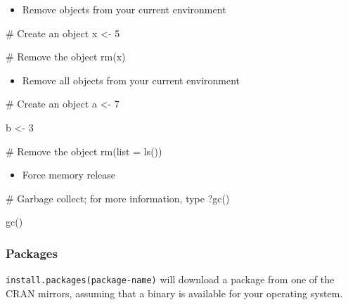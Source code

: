 \documentclass[
  letterpaper,
  DIV=11,
  numbers=noendperiod]{scrreprt}
\newenvironment{Shaded}{\begin{snugshade}}{\end{snugshade}}
\newcommand{\AttributeTok}[1]{\textcolor[rgb]{0.40,0.45,0.13}{#1}}
\newcommand{\CommentTok}[1]{\textcolor[rgb]{0.37,0.37,0.37}{#1}}
\newcommand{\DecValTok}[1]{\textcolor[rgb]{0.68,0.00,0.00}{#1}}
\newcommand{\FunctionTok}[1]{\textcolor[rgb]{0.28,0.35,0.67}{#1}}
\newcommand{\NormalTok}[1]{\textcolor[rgb]{0.00,0.23,0.31}{#1}}
\newcommand{\OtherTok}[1]{\textcolor[rgb]{0.00,0.23,0.31}{#1}}
\providecommand{\tightlist}{%
  \setlength{\itemsep}{0pt}\setlength{\parskip}{0pt}}\usepackage{longtable,booktabs,array}
\begin{document}
\begin{itemize}
\tightlist
\item
  Remove objects from your current environment
\end{itemize}

\begin{Shaded}
\begin{Highlighting}[]
\CommentTok{\# Create an object }
\NormalTok{x }\OtherTok{\textless{}{-}} \DecValTok{5}

\CommentTok{\# Remove the object }
\FunctionTok{rm}\NormalTok{(x)}
\end{Highlighting}
\end{Shaded}

\begin{itemize}
\tightlist
\item
  Remove all objects from your current environment
\end{itemize}

\begin{Shaded}
\begin{Highlighting}[]
\CommentTok{\# Create an object }
\NormalTok{a }\OtherTok{\textless{}{-}} \DecValTok{7}

\NormalTok{b }\OtherTok{\textless{}{-}} \DecValTok{3}

\CommentTok{\# Remove the object }
\FunctionTok{rm}\NormalTok{(}\AttributeTok{list =} \FunctionTok{ls}\NormalTok{())}
\end{Highlighting}
\end{Shaded}

\begin{itemize}
\tightlist
\item
  Force memory release
\end{itemize}

\begin{Shaded}
\begin{Highlighting}[]
\CommentTok{\# Garbage collect; for more information, type ?gc() }

\FunctionTok{gc}\NormalTok{()}
\end{Highlighting}
\end{Shaded}

\hypertarget{packages}{%
\subsubsection*{Packages}\label{packages}}

\texttt{install.packages(package-name)} will download a package from one
of the CRAN mirrors, assuming that a binary is available for your
operating system.
\end{document}
